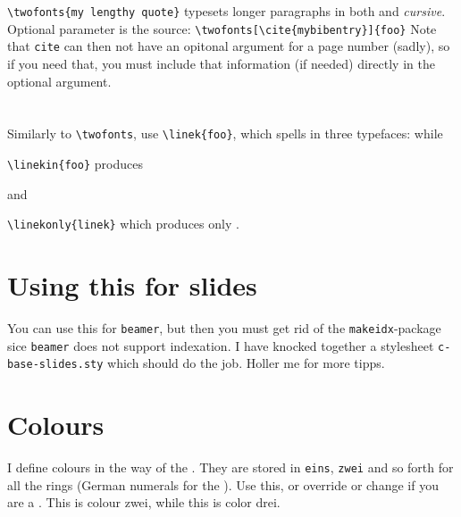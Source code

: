 \documentclass[14pt,ngerman]{extarticle}  %
\begin{document}
\verb|\twofonts{my lengthy quote}| typesets longer paragraphs in both  and \emph{cursive}. Optional parameter is the source: \verb|\twofonts[\cite{mybibentry}]{foo}| Note that \verb|cite| can then not have an opitonal argument for a page number (sadly), so if you need that, you must include that information (if needed) directly in the optional argument. 


\section{}

Similarly to \verb|\twofonts|, use \verb|\linek{foo}|, which spells in three typefaces:
while

\verb|\linekin{foo}| produces 

and

\verb|\linekonly{linek}| which produces only 
.

\section{Using this for slides}

You can use this for \verb|beamer|, but then you must get rid of the \verb|makeidx|-package sice \verb|beamer| does not support indexation. I have knocked together a stylesheet \verb|c-base-slides.sty| which should do the job. Holler me for more tipps.

\section{Colours}

I define colours in the way of the . They are stored in \verb|eins|, \verb|zwei| and so forth for all the rings (German numerals for the ). Use this, or override or change if you are a . {\color{zwei} This is colour zwei}, while {\color{drei} this is color drei}.

\begingroup %

    
\end{document}
